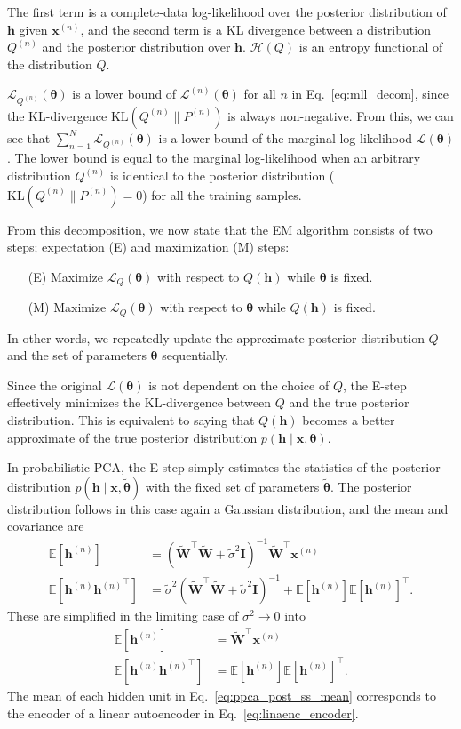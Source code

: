 \documentclass{now}
\newcommand{\vect}[1]{\mathbf{#1}}
\newcommand{\vects}[1]{\boldsymbol{#1}}
\newcommand{\matr}[1]{\mathbf{#1}}
\newcommand{\vh}[0]{\vect{h}}
\newcommand{\vx}[0]{\vect{x}}
\newcommand{\mW}[0]{\matr{W}}
\newcommand{\mI}{\matr{I}}
\newcommand{\TT}[0]{{\vects{\theta}}}
\newcommand{\LL}[0]{\mathcal{L}}
\newcommand{\HH}[0]{\mathcal{H}}
\newcommand{\KL}[0]{\text{KL}}
\newcommand{\E}[0]{\mathbb{E}}
\begin{document}
The first term is a complete-data log-likelihood over the posterior distribution
of $\vh$ given $\vx^{(n)}$, and the second term is a KL divergence between a
distribution $Q^{(n)}$ and the posterior distribution over $\vh$. $\HH(Q)$ is
an entropy functional of the distribution $Q$.

$\LL_{Q^{(n)}}(\TT)$ is a lower bound of $\LL^{(n)}(\TT)$ for all $n$ in
Eq.~\eqref{eq:mll_decom}, since the KL-divergence $\KL(Q^{(n)}\| P^{(n)})$ is
always non-negative. From this, we can see that $\sum_{n=1}^N
\LL_{Q^{(n)}}(\TT)$ is a lower bound of the marginal log-likelihood $\LL(\TT)$.
The lower bound is equal to the marginal log-likelihood when an arbitrary
distribution $Q^{(n)}$ is identical to the posterior distribution ($\KL(Q^{(n)}
\| P^{(n)}) = 0$) for all the training samples.

From this decomposition, we now state that the EM algorithm consists of two
steps; expectation (E) and maximization (M) steps:
\begin{enumerate}
    \itemsep 0em
    \item[(E)] Maximize $\LL_Q(\TT)$ with respect to $Q(\vh)$ while $\TT$ is
        fixed.
    \item[(M)] Maximize $\LL_Q(\TT)$ with respect to $\TT$ while $Q(\vh)$ is
        fixed.
\end{enumerate}
In other words, we repeatedly update the approximate posterior distribution $Q$
and the set of parameters $\TT$ sequentially. 

Since the original $\LL(\TT)$ is not dependent on the choice of $Q$, the E-step
effectively minimizes the KL-divergence between $Q$ and the true posterior
distribution. This is equivalent to saying that $Q(\vh)$ becomes a better
approximate of the true posterior distribution $p(\vh\mid\vx,\TT)$.

In probabilistic PCA, the E-step simply estimates the statistics of the
posterior distribution $p(\vh \mid \vx, \tilde{\TT})$ with the fixed set of
parameters $\tilde{\TT}$.  The posterior distribution follows in this case again
a Gaussian distribution, and the mean and covariance are
\begin{align*}
    \E \left[ \vh^{(n)} \right] &= (\tilde{\mW}^\top
    \tilde{\mW} + \tilde{\sigma}^2
    \mI)^{-1} \tilde{\mW}^\top \vx^{(n)} \\
    \E \left[ \vh^{(n)} {\vh^{(n)}}^\top \right] &=
    \tilde{\sigma}^2 (\tilde{\mW}^\top \tilde{\mW} +
    \tilde{\sigma}^2
    \mI)^{-1} + \E\left[\vh^{(n)}\right] \E\left[ \vh^{(n)}
    \right]^\top.
\end{align*}
These are simplified in the limiting case of $\sigma^2 \to 0$ into
\begin{align}
    \label{eq:ppca_post_ss_mean}
    \E \left[ \vh^{(n)} \right] &= \tilde{\mW}^\top \vx^{(n)} \\
    \label{eq:ppca_post_ss_cov}
    \E \left[ \vh^{(n)} {\vh^{(n)}}^\top \right] &=
    \E\left[\vh^{(n)}\right] \E\left[ \vh^{(n)}
    \right]^\top.
\end{align}
The mean of each hidden unit in Eq.~\eqref{eq:ppca_post_ss_mean} corresponds to
the encoder of a linear autoencoder in Eq.~\eqref{eq:linaenc_encoder}.
\end{document}

